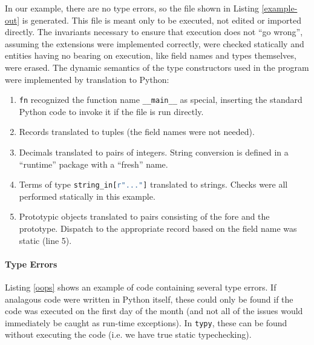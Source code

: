 \documentclass{sigplanconf}
\newcommand{\lip}[1]{\lstinline[language=Python,basicstyle=\ttfamily\small,deletendkeywords={tuple,buffer,map}]{#1}}
\begin{document}
In our example, there are no type errors, so the file shown in Listing \ref{example-out}  is generated. This file is meant only to be executed, not edited or imported directly. The invariants necessary to ensure that execution does not ``go wrong'', assuming the extensions were implemented correctly, were checked statically and entities having no bearing on execution, like field names and types themselves, were erased. The dynamic semantics of the type constructors used in the program were implemented by translation to Python:%
\begin{enumerate}
\item \lip{fn} recognized the function name \lip{__main__} as special, inserting the standard Python code to invoke it if the file is run directly.
\item Records translated to tuples (the field names were not needed).
\item Decimals translated to pairs of integers. String conversion is defined in a ``runtime'' package with a ``fresh'' name.
\item Terms of type \lip{string_in[r"..."]} translated to strings. Checks were all performed  statically in this example.%
\item Prototypic objects translated to pairs consisting of the fore and the prototype. Dispatch to the appropriate record based on the field name was static (line 5).
\end{enumerate}


\paragraph{Type Errors} Listing \ref{oops} shows an example of code containing several type errors. If analagous code were written in Python itself, these could only be found if the code was executed on the first day of the month (and not all of the issues would  immediately be caught as run-time exceptions). In \texttt{typy}, these can be found without executing the code (i.e. we have true static typechecking).
\end{document}
